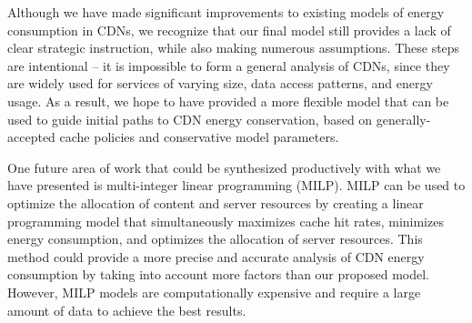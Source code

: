\documentclass[
	a4paper, %
	10pt, %
	unnumberedsections, %
	twoside, %
]{LTJournalArticle}
\begin{document}
Although we have made significant improvements to existing models of energy consumption in CDNs, we recognize that our final model still provides a lack of clear strategic instruction, while also making numerous assumptions. These steps are intentional -- it is impossible to form a general analysis of CDNs, since they are widely used for services of varying size, data access patterns, and energy usage. As a result, we hope to have provided a more flexible model that can be used to guide initial paths to CDN energy conservation, based on generally-accepted cache policies and conservative model parameters.

One future area of work that could be synthesized productively with what we have presented is multi-integer linear programming (MILP). MILP can be used to optimize the allocation of content and server resources by creating a linear programming model that simultaneously maximizes cache hit rates, minimizes energy consumption, and optimizes the allocation of server resources. This method could provide a more precise and accurate analysis of CDN energy consumption by taking into account more factors than our proposed model. However, MILP models are computationally expensive and require a large amount of data to achieve the best results.


\printbibliography
\end{document}
